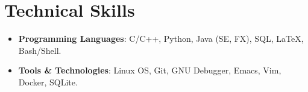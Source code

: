 \documentclass[letterpaper, 11pt]{article}
\newcommand{\techSkillItem}[2] {\item\small{\textbf{#1}{#2 \vspace{-2pt}}}}
\begin{document}
\section{Technical Skills}
\begin{itemize}[leftmargin=*]
  \techSkillItem{Programming Languages}{: C/C++, Python, Java (SE, FX), SQL, \LaTeX{}, Bash/Shell.}
  \techSkillItem{Tools \& Technologies}{: Linux OS, Git, GNU Debugger, Emacs, Vim, Docker, SQLite.}
\end{itemize}
\end{document}
